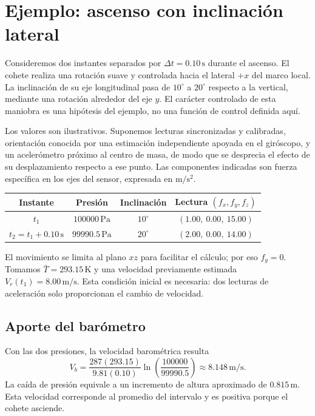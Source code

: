 \newpage
\section{Ejemplo: ascenso con inclinación lateral}
Consideremos dos instantes separados por $\Delta t=0.10\,\mathrm{s}$ durante el ascenso. El cohete realiza una rotación suave y controlada hacia el lateral $+x$ del marco local. La inclinación de su eje longitudinal pasa de $10^\circ$ a $20^\circ$ respecto a la vertical, mediante una rotación alrededor del eje $y$. El carácter controlado de esta maniobra es una hipótesis del ejemplo, no una función de control definida aquí.

Los valores son ilustrativos. Suponemos lecturas sincronizadas y calibradas, orientación conocida por una estimación independiente apoyada en el giróscopo, y un acelerómetro próximo al centro de masa, de modo que se desprecia el efecto de su desplazamiento respecto a ese punto. Las componentes indicadas son fuerza específica en los ejes del sensor, expresada en $\mathrm{m/s^2}$.
\begin{center}
\begin{tabular}{c|c|c|c}
Instante & Presión & Inclinación & Lectura $(f_x,f_y,f_z)$ \\
\hline
$t_1$ & $100000\,\mathrm{Pa}$ & $10^\circ$ & $(1.00,\ 0.00,\ 15.00)$ \\
$t_2=t_1+0.10\,\mathrm{s}$ & $99990.5\,\mathrm{Pa}$ & $20^\circ$ & $(2.00,\ 0.00,\ 14.00)$
\end{tabular}
\end{center}
El movimiento se limita al plano $xz$ para facilitar el cálculo; por eso $f_y=0$. Tomamos $\bar T=293.15\,\mathrm{K}$ y una velocidad previamente estimada $V_r(t_1)=8.00\,\mathrm{m/s}$. Esta condición inicial es necesaria: dos lecturas de aceleración solo proporcionan el cambio de velocidad.

\subsection{Aporte del barómetro}
Con las dos presiones, la velocidad barométrica resulta
\begin{equation}
 V_b=\frac{287(293.15)}{9.81(0.10)}
 \ln\left(\frac{100000}{99990.5}\right)
 \approx8.148\,\mathrm{m/s}.
\end{equation}
La caída de presión equivale a un incremento de altura aproximado de $0.815\,\mathrm{m}$. Esta velocidad corresponde al promedio del intervalo y es positiva porque el cohete asciende.

